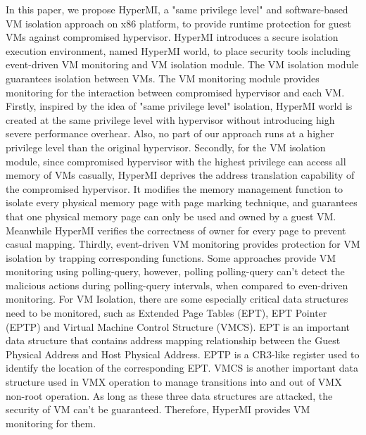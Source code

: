 \documentclass[conference]{IEEEtran}
\begin{document}
In this paper, we propose HyperMI, a "same privilege level" and software-based VM isolation approach on x86 platform, to provide runtime protection for guest VMs against compromised hypervisor. HyperMI introduces a secure isolation execution environment, named HyperMI world, to place security tools including event-driven VM monitoring and VM isolation module. The VM isolation module guarantees isolation between VMs. The VM monitoring module provides monitoring for the interaction between compromised hypervisor and each VM. 
Firstly, inspired by the idea of "same privilege level" isolation, HyperMI world is created at the same privilege level with hypervisor without introducing high severe performance overhear. Also, no part of our approach runs at a higher privilege level than the original hypervisor. 
Secondly, for the VM isolation module, since compromised hypervisor with the highest privilege can access all memory of VMs casually, 
HyperMI deprives the address translation capability of the compromised hypervisor. 
It modifies the memory management function to isolate every physical memory page with page marking technique, and guarantees that one physical memory page can only be used and owned by a guest VM. Meanwhile
HyperMI verifies the correctness of owner for every page to prevent casual mapping.
Thirdly, event-driven VM monitoring provides protection for VM isolation by trapping corresponding functions. 
Some approaches provide VM monitoring using polling-query, however, polling polling-query can't detect the malicious actions during polling-query intervals,
when compared to even-driven monitoring. For VM Isolation, there are some especially critical data structures need to be monitored, such as Extended Page Tables (EPT), EPT Pointer (EPTP) and Virtual Machine Control Structure (VMCS). EPT is an important data structure that contains address mapping relationship between the Guest Physical Address and Host Physical Address. EPTP is a CR3-like register used to identify the location of the corresponding EPT. VMCS is another important data structure used in VMX operation to manage transitions into and out of VMX non-root operation. 
As long as these three data structures are attacked, the security of VM can't be guaranteed. Therefore, HyperMI provides VM monitoring for them.
\end{document}
